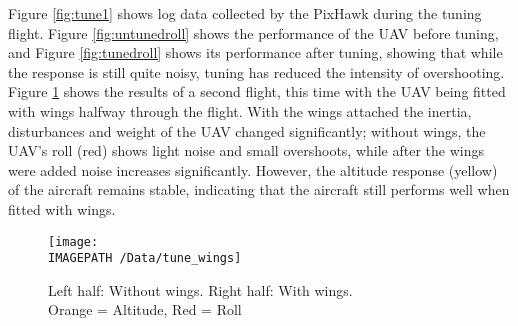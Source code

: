 Figure \ref{fig:tune1} shows log data collected by the PixHawk during the tuning flight. Figure \ref{fig:untunedroll} shows the performance of the UAV before tuning, and Figure \ref{fig:tunedroll} shows its performance after tuning, showing that while the response is still quite noisy, tuning has reduced the intensity of overshooting. Figure \ref{fig:tune2} shows the results of a second flight, this time with the UAV being fitted with wings halfway through the flight. With the wings attached the inertia, disturbances and weight of the UAV changed significantly; without wings, the UAV's roll (red) shows light noise and small overshoots, while after the wings were added noise increases significantly. However, the altitude response (yellow) of the aircraft remains stable, indicating that the aircraft still performs well when fitted with wings.

\begin{figure}[!ht]
	\centering
	\texttt{[image: \\IMAGEPATH /Data/tune\_wings]}
	\caption{Left half: Without wings. Right half: With wings.\\ Orange = Altitude, Red = Roll}
	\label{fig:tune2}
\end{figure}